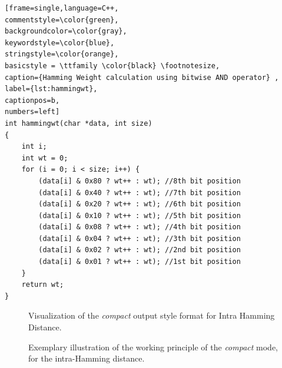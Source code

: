 \begin{center}
\begin{minipage}{0.7\textwidth}
\begin{lstlisting}[frame=single,language=C++,
commentstyle=\color{green},
backgroundcolor=\color{gray},
keywordstyle=\color{blue},
stringstyle=\color{orange},
basicstyle = \ttfamily \color{black} \footnotesize,
caption={Hamming Weight calculation using bitwise AND operator} ,
label={lst:hammingwt},
captionpos=b,
numbers=left]
int hammingwt(char *data, int size)
{
    int i;
    int wt = 0;
    for (i = 0; i < size; i++) {
        (data[i] & 0x80 ? wt++ : wt); //8th bit position
        (data[i] & 0x40 ? wt++ : wt); //7th bit position
        (data[i] & 0x20 ? wt++ : wt); //6th bit position
        (data[i] & 0x10 ? wt++ : wt); //5th bit position
        (data[i] & 0x08 ? wt++ : wt); //4th bit position
        (data[i] & 0x04 ? wt++ : wt); //3th bit position
        (data[i] & 0x02 ? wt++ : wt); //2nd bit position
        (data[i] & 0x01 ? wt++ : wt); //1st bit position
    }
    return wt;
}
\end{lstlisting}
\end{minipage}
\end{center}

\begin{figure}
\centering
{}
\caption{Visualization of the \emph{compact} output style format for Intra Hamming Distance.}
\label{img:4_intra_compact}
\end{figure}

\begin{figure}
\centering
{}
\caption{Exemplary illustration of the working principle of the \emph{compact} mode, for the intra-Hamming distance.}
\label{img:4_intra_WP}
\end{figure}

